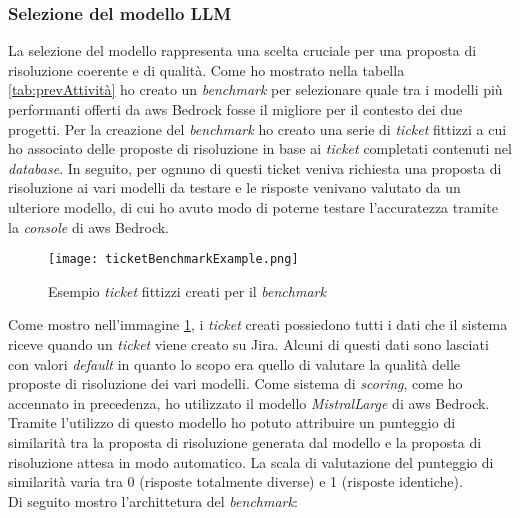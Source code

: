 \subsubsection{Selezione del modello LLM}
La selezione del modello rappresenta una scelta cruciale per una proposta di risoluzione coerente e di qualità. Come ho mostrato nella tabella \ref{tab:prevAttività} ho creato un \textit{benchmark} per selezionare quale tra i modelli più performanti offerti da \gls{aws} Bedrock fosse il migliore per il contesto dei due progetti.
Per la creazione del \textit{benchmark} ho creato una serie di \textit{ticket} fittizzi a cui ho associato delle proposte di risoluzione in base ai \textit{ticket} completati contenuti nel \textit{database}. In seguito, per ognuno di questi ticket veniva richiesta una proposta di risoluzione ai vari modelli da testare e le risposte venivano valutato da un ulteriore modello, di cui ho avuto modo di poterne testare l'accuratezza tramite la \textit{console} di \gls{aws} Bedrock.
\begin{figure}[H]
    \centering
    \texttt{[image: ticketBenchmarkExample.png]}
    \caption{Esempio \textit{ticket} fittizzi creati per il \textit{benchmark}}
    \label{fig:Ticketbenchmark}
\end{figure}
\noindent
Come mostro nell'immagine \ref{fig:Ticketbenchmark}, i \textit{ticket} creati possiedono tutti i dati che il sistema riceve quando un \textit{ticket} viene creato su Jira. Alcuni di questi dati sono lasciati con valori \textit{default} in quanto lo scopo era quello di valutare la qualità delle proposte di risoluzione dei vari modelli. 
Come sistema di \textit{scoring}, come ho accennato in precedenza, ho utilizzato il modello \textit{MistralLarge} di \gls{aws} Bedrock. Tramite l'utilizzo di questo modello ho potuto attribuire un punteggio di similarità tra la proposta di risoluzione generata dal modello e la proposta di risoluzione attesa in modo automatico. La scala di valutazione del punteggio di similarità varia tra 0 (risposte totalmente diverse) e 1 (risposte identiche). \\
Di seguito mostro l'archittetura del \textit{benchmark}:
